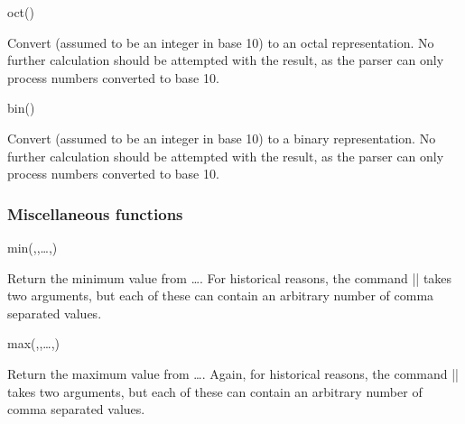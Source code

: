 \begin{math-function}{oct()}
\mathcommand

  Convert  (assumed to be an integer in base 10) to an
  octal representation.
  No further calculation should be attempted with the result, as
  the parser can only process numbers converted to base 10.
\begin{codeexample}[]
 \pgfmathresult
\end{codeexample}
\end{math-function}

\begin{math-function}{bin()}
\mathcommand

  Convert  (assumed to be an integer in base 10) to a
  binary representation.
  No further calculation should be attempted with the result, as
  the parser can only process numbers converted to base 10.

\begin{codeexample}[]
 \pgfmathresult
\end{codeexample}
\end{math-function}

\subsubsection{Miscellaneous functions}

\label{pgfmath-functions-misc}

\begin{math-function}{min(,,\ldots,)}

  Return the minimum value from \ldots{}.
  For historical reasons, the command |\pgfmathmin| takes two
  arguments, but each of these can contain an arbitrary number
  of comma separated values.

\begin{codeexample}[]
 \pgfmathresult
\end{codeexample}

\end{math-function}


\begin{math-function}{max(,,\ldots,)}

  Return the maximum value from \ldots{}.
  Again, for historical reasons, the command |\pgfmathmax| takes two
  arguments, but each of these can contain an arbitrary number
  of comma separated values.

\begin{codeexample}[]
 \pgfmathresult
\end{codeexample}

\end{math-function}


